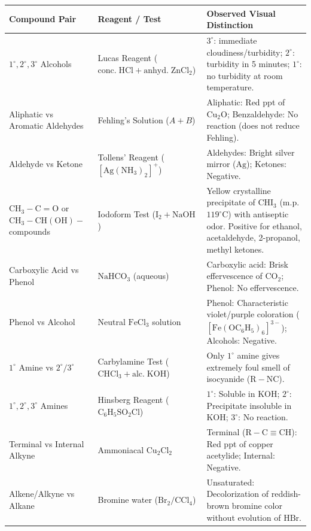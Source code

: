 \documentclass[10pt,a4paper]{article}
\begin{document}
\begin{conceptbox}
\begin{center}
\scriptsize
\begin{tabular}{|p{2.8cm}|p{3.5cm}|p{8.5cm}|}
\hline
\textbf{Compound Pair} & \textbf{Reagent / Test} & \textbf{Observed Visual Distinction} \\
\hline
$1^\circ, 2^\circ, 3^\circ$ Alcohols & Lucas Reagent ($\mathrm{conc.\; HCl + anhyd.\; ZnCl_2}$) & $3^\circ$: immediate cloudiness/turbidity; $2^\circ$: turbidity in 5 minutes; $1^\circ$: no turbidity at room temperature. \\
\hline
Aliphatic vs Aromatic Aldehydes & Fehling's Solution ($A + B$) & Aliphatic: Red ppt of $\mathrm{Cu_2O}$; Benzaldehyde: No reaction (does not reduce Fehling). \\
\hline
Aldehyde vs Ketone & Tollens' Reagent ($[\mathrm{Ag(NH_3)_2}]^+$) & Aldehydes: Bright silver mirror ($\mathrm{Ag}$); Ketones: Negative. \\
\hline
$\mathrm{CH_3-C=O}$ or $\mathrm{CH_3-CH(OH)-}$ compounds & Iodoform Test ($\mathrm{I_2 + NaOH}$) & Yellow crystalline precipitate of $\mathrm{CHI_3}$ (m.p. $119^\circ\mathrm{C}$) with antiseptic odor. Positive for ethanol, acetaldehyde, 2-propanol, methyl ketones. \\
\hline
Carboxylic Acid vs Phenol & $\mathrm{NaHCO}_3$ (aqueous) & Carboxylic acid: Brisk effervescence of $\mathrm{CO}_2$; Phenol: No effervescence. \\
\hline
Phenol vs Alcohol & Neutral $\mathrm{FeCl}_3$ solution & Phenol: Characteristic violet/purple coloration ($\mathrm{[Fe(OC_6H_5)_6]^{3-}}$); Alcohols: Negative. \\
\hline
$1^\circ$ Amine vs $2^\circ/3^\circ$ & Carbylamine Test ($\mathrm{CHCl_3 + alc.\; KOH}$) & Only $1^\circ$ amine gives extremely foul smell of isocyanide ($\mathrm{R-NC}$). \\
\hline
$1^\circ, 2^\circ, 3^\circ$ Amines & Hinsberg Reagent ($\mathrm{C_6H_5SO_2Cl}$) & $1^\circ$: Soluble in $\mathrm{KOH}$; $2^\circ$: Precipitate insoluble in $\mathrm{KOH}$; $3^\circ$: No reaction. \\
\hline
Terminal vs Internal Alkyne & Ammoniacal $\mathrm{Cu_2Cl_2}$ & Terminal ($\mathrm{R-C\equiv CH}$): Red ppt of copper acetylide; Internal: Negative. \\
\hline
Alkene/Alkyne vs Alkane & Bromine water ($\mathrm{Br_2 / CCl_4}$) & Unsaturated: Decolorization of reddish-brown bromine color without evolution of $\mathrm{HBr}$. \\
\hline
\end{tabular}
\end{center}
\end{conceptbox}
\end{document}
